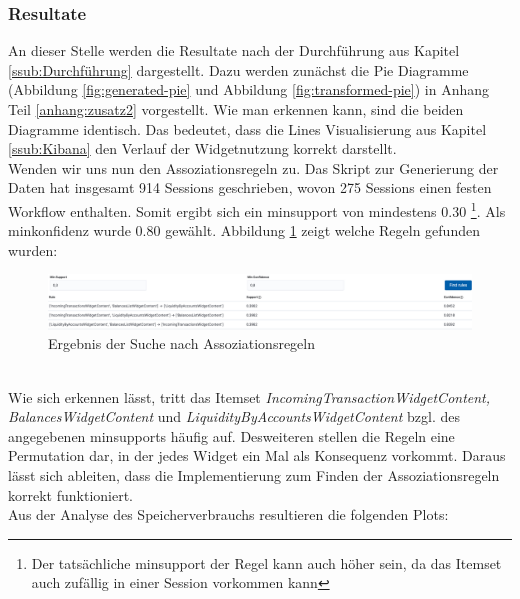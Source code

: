 \subsubsection{Resultate}
\label{ssub:Resultate}
An dieser Stelle werden die Resultate nach der Durchführung aus Kapitel \ref{ssub:Durchführung} dargestellt.
Dazu werden zunächst die Pie Diagramme (Abbildung \ref{fig:generated-pie} und Abbildung \ref{fig:transformed-pie}) in Anhang Teil \ref{anhang:zusatz2} vorgestellt. Wie man erkennen kann, sind die beiden Diagramme identisch. Das bedeutet, dass die Lines Visualisierung aus Kapitel \ref{ssub:Kibana} den Verlauf der Widgetnutzung korrekt darstellt.\\
Wenden wir uns nun den Assoziationsregeln zu. Das Skript zur Generierung der Daten hat insgesamt 914 Sessions geschrieben, wovon 275 Sessions einen festen Workflow enthalten. Somit ergibt sich ein minsupport von mindestens 0.30 \footnote{Der tatsächliche minsupport der Regel kann auch höher sein, da das Itemset auch zufällig in einer Session vorkommen kann}. Als minkonfidenz wurde 0.80 gewählt. Abbildung \ref{fig:associationrule-result} zeigt welche Regeln gefunden wurden:\\
\begin{figure}[htb]
\begin{center}
	\includegraphics[width=430pt]{bilder/associationrules_result.png}
\end{center}
\caption{Ergebnis der Suche nach Assoziationsregeln}
\label{fig:associationrule-result}
\end{figure}
\\
Wie sich erkennen lässt, tritt das Itemset \textit{IncomingTransactionWidgetContent, BalancesWidgetContent} und \textit{LiquidityByAccountsWidgetContent} bzgl. des angegebenen minsupports häufig auf. Desweiteren stellen die Regeln eine Permutation dar, in der jedes Widget ein Mal als Konsequenz vorkommt. Daraus lässt sich ableiten, dass die Implementierung zum Finden der Assoziationsregeln korrekt funktioniert.\\
Aus der Analyse des Speicherverbrauchs resultieren die folgenden Plots:\\
\clearpage
